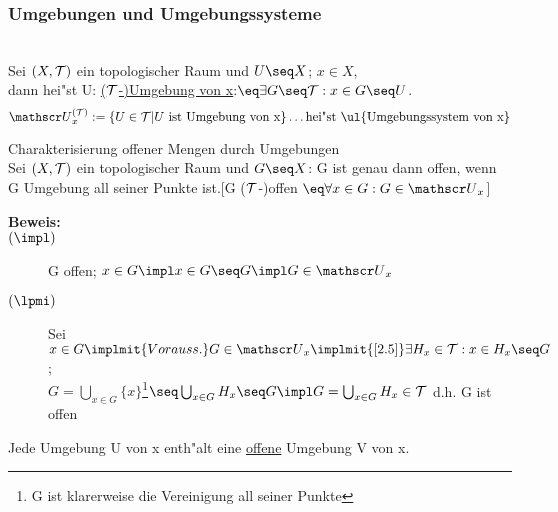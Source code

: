 \subsubsection{Umgebungen und Umgebungssysteme}
\begin{definition}\label{2.5}\\
Sei $(X,\mathcal T )$ ein topologischer Raum und $U\seq X$; $x\in X$,\\
dann hei"st U: \ul{($\mathcal T$-)Umgebung von x}:$\eq\exists G\seq\T : x\in G\seq U$.
$$\umg{U}{x}^{(\T )} :=\{ U\in\T |U\mbox{ ist Umgebung von x}\}\dots\mbox{hei"st \ul{Umgebungssystem von x}}$$
\end{definition}
\begin{prop}\label{2.6}{Charakterisierung offener Mengen durch Umgebungen}\\
Sei $(X,\mathcal T)$ ein topologischer Raum und $G\seq X$: G ist genau dann offen, wenn G Umgebung all seiner Punkte ist.[G ($\mathcal T$-)offen $\eq \forall x\in G: G\in\umg{U}{x}$]
\begin{description}
\item[\bf Beweis:]
\item[$(\impl )$]G offen; $x\in G\impl x\in G\seq G \impl G\in\umg{U}{x}$
\item[$(\lpmi )$] Sei $x\in G \implmit{Vorauss.} G\in\umg{U}{x}\implmit{\ref{2.5}}\exists H_x\in\T :x\in H_x\seq G$;\\
$G=\bigcup_{x\in G}\{ x\}$\footnote{G ist klarerweise die Vereinigung all seiner Punkte}$ \seq \bigcup_{x\in G}H_x\seq G\impl G = \bigcup_{x\in G} H_x\in\T$ d.h. G ist offen\hfill\fertig
\end{description}
\end{prop}

\begin{kor}\label{2.7}Jede Umgebung U von x enth"alt eine \ul{offene} Umgebung V von x.
\end{kor}

